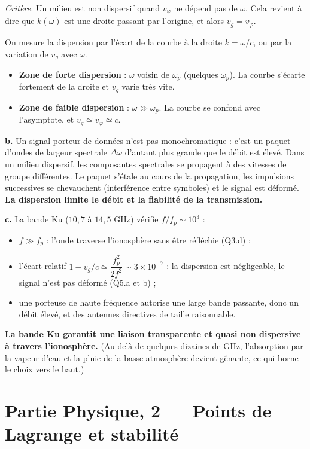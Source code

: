 \documentclass[11pt,a4paper]{article}
\providecommand{\tightlist}{\setlength{\itemsep}{0pt}\setlength{\parskip}{0pt}}
\begin{document}
\emph{Critère.} Un milieu est non dispersif quand \(v_\varphi\) ne dépend pas de \(\omega\). Cela revient à dire que \(k(\omega)\) est une droite passant par l'origine, et alors \(v_g=v_\varphi\).

On mesure la dispersion par l'écart de la courbe à la droite \(k=\omega/c\), ou par la variation de \(v_g\) avec \(\omega\).

\begin{itemize}
\tightlist
\item
  \textbf{Zone de forte dispersion} : \(\omega\) voisin de \(\omega_p\) (quelques \(\omega_p\)). La courbe s'écarte fortement de la droite et \(v_g\) varie très vite.
\item
  \textbf{Zone de faible dispersion} : \(\omega\gg\omega_p\). La courbe se confond avec l'asymptote, et \(v_g\simeq v_\varphi\simeq c\).
\end{itemize}

\textbf{b.} Un signal porteur de données n'est pas monochromatique : c'est un paquet d'ondes de largeur spectrale \(\Delta\omega\) d'autant plus grande que le débit est élevé. Dans un milieu dispersif, les composantes spectrales se propagent à des vitesses de groupe différentes. Le paquet s'étale au cours de la propagation, les impulsions successives se chevauchent (interférence entre symboles) et le signal est déformé. \textbf{La dispersion limite le débit et la fiabilité de la transmission.}

\textbf{c.} La bande Ku (\(10{,}7\) à \(14{,}5\) GHz) vérifie \(f/f_p\sim10^3\) :

\begin{itemize}
\tightlist
\item
  \(f\gg f_p\) : l'onde traverse l'ionosphère sans être réfléchie (Q3.d) ;
\item
  l'écart relatif \(1-v_g/c\simeq\dfrac{f_p^2}{2f^2}\sim3\times10^{-7}\) : la dispersion est négligeable, le signal n'est pas déformé (Q5.a et b) ;
\item
  une porteuse de haute fréquence autorise une large bande passante, donc un débit élevé, et des antennes directives de taille raisonnable.
\end{itemize}

\textbf{La bande Ku garantit une liaison transparente et quasi non dispersive à travers l'ionosphère.} (Au-delà de quelques dizaines de GHz, l'absorption par la vapeur d'eau et la pluie de la basse atmosphère devient gênante, ce qui borne le choix vers le haut.)

\hypertarget{partie-physique-2-points-de-lagrange-et-stabilituxe9}{%
\section{Partie Physique, 2 --- Points de Lagrange et stabilité}\label{partie-physique-2-points-de-lagrange-et-stabilituxe9}}
\end{document}
